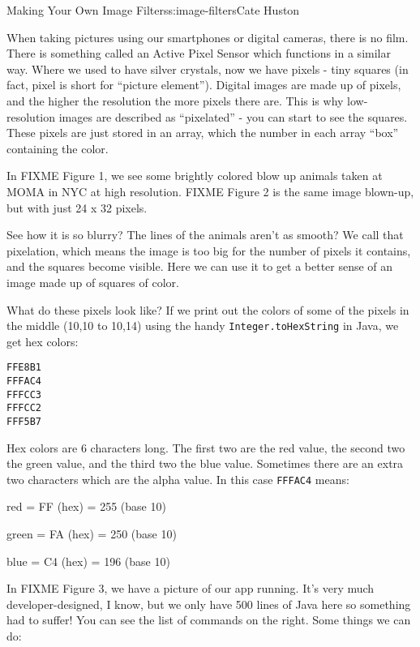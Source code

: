 \begin{aosachapter}{Making Your Own Image Filters}{s:image-filters}{Cate Huston}
\label{photographs-the-digital-way}

When taking pictures using our smartphones or digital cameras, there is
no film. There is something called an Active Pixel Sensor which
functions in a similar way. Where we used to have silver crystals, now
we have pixels - tiny squares (in fact, pixel is short for ``picture
element''). Digital images are made up of pixels, and the higher the
resolution the more pixels there are. This is why low-resolution images
are described as ``pixelated'' - you can start to see the squares. These
pixels are just stored in an array, which the number in each array
``box'' containing the color.

In FIXME Figure 1, we see some brightly colored blow up animals taken at
MOMA in NYC at high resolution. FIXME Figure 2 is the same image
blown-up, but with just 24 x 32 pixels.

See how it is so blurry? The lines of the animals aren't as smooth? We
call that pixelation, which means the image is too big for the number of
pixels it contains, and the squares become visible. Here we can use it
to get a better sense of an image made up of squares of color.

What do these pixels look like? If we print out the colors of some of
the pixels in the middle (10,10 to 10,14) using the handy
\texttt{Integer.toHexString} in Java, we get hex colors:

\begin{verbatim}
FFE8B1
FFFAC4
FFFCC3
FFFCC2
FFF5B7
\end{verbatim}

Hex colors are 6 characters long. The first two are the red value, the
second two the green value, and the third two the blue value. Sometimes
there are an extra two characters which are the alpha value. In this
case \texttt{FFFAC4} means:

\begin{aosaitemize}

\item
  red = FF (hex) = 255 (base 10)
\item
  green = FA (hex) = 250 (base 10)
\item
  blue = C4 (hex) = 196 (base 10)
\end{aosaitemize}

\label{running-the-app}

In FIXME Figure 3, we have a picture of our app running. It's very much
developer-designed, I know, but we only have 500 lines of Java here so
something had to suffer! You can see the list of commands on the right.
Some things we can do:


\end{aosachapter}

